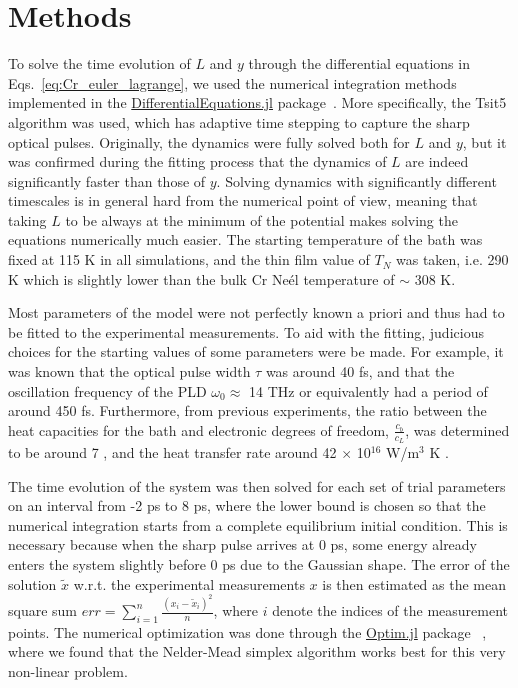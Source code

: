 \section{Methods \label{sec:Cr_Methods}}
To solve the time evolution of $L$ and $y$ through the differential equations in Eqs.~\ref{eq:Cr_euler_lagrange}, we used the numerical integration methods implemented in the \href{https://github.com/SciML/DifferentialEquations.jl}{DifferentialEquations.jl} package~\cite{rackauckas2017differentialequations}. More specifically, the Tsit5 algorithm was used, which has adaptive time stepping to capture the sharp optical pulses.
Originally, the dynamics were fully solved both for $L$ and $y$, but it was confirmed during the fitting process that the dynamics of $L$ are indeed significantly faster than those of $y$.
Solving dynamics with significantly different timescales is in general hard from the numerical point of view, meaning that taking $L$ to be always at the minimum of the potential makes solving the equations numerically much easier.
The starting temperature of the bath was fixed at 115 K in all simulations, and the thin film value of $T_N$ was taken, i.e. 290 K which is slightly lower than the bulk Cr Ne\'el temperature of $\sim$ 308 K.

Most parameters of the model were not perfectly known a priori and thus had to be fitted to the experimental measurements.
To aid with the fitting, judicious choices for the starting values of some parameters were be made.
For example, it was known that the optical pulse width $\tau$ was around 40 fs, and that the oscillation frequency of the \gls{PLD} $\omega_0 \approx$ 14 THz or equivalently had a period of around 450 fs.
Furthermore, from previous experiments, the ratio between the heat capacities for the bath and electronic degrees of freedom, $\frac{c_b}{c_L}$, was determined to be around 7 \cite{Nicholson2016}, and the heat transfer rate around 42 $\times$ 10$^{16}$ W/m$^3$ K \cite{Hostetler1999}.

The time evolution of the system was then solved for each set of trial parameters on an interval from -2 ps to 8 ps, where the lower bound is chosen so that the numerical integration starts from a complete equilibrium initial condition.
This is necessary because when the sharp pulse arrives at 0 ps, some energy already enters the system slightly before 0 ps due to the Gaussian shape.
The error of the solution $\tilde{x}$ w.r.t. the experimental measurements $x$ is then estimated as the mean square sum $err = \sum_{i=1}^n \frac{(x_i - \tilde{x}_i)^2}{n}$, where $i$ denote the indices of the measurement points.
The numerical optimization was done through the \href{https://github.com/JuliaNLSolvers/Optim.jl}{Optim.jl} package ~\cite{mogensen2018optim}, where we found that the Nelder-Mead simplex algorithm \cite{Nelder1965} works best for this very non-linear problem.

